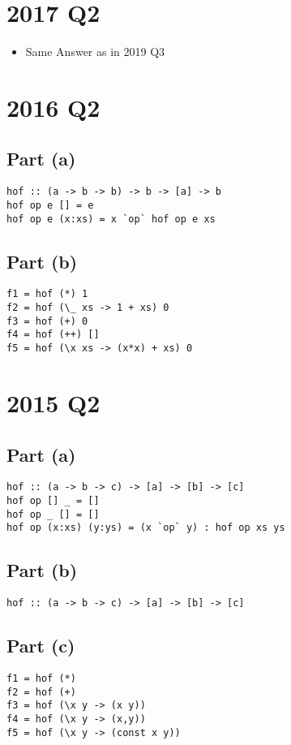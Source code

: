 \documentclass[11pt]{article}
\begin{document}
\section{2017 Q2}
\label{sec:org8e4f95c}
\begin{itemize}
\item Same Answer as in 2019 Q3
\end{itemize}
\section{2016 Q2}
\label{sec:orgf140ca6}
\subsection{Part (a)}
\label{sec:org2d3f31d}
\begin{verbatim}
hof :: (a -> b -> b) -> b -> [a] -> b
hof op e [] = e
hof op e (x:xs) = x `op` hof op e xs
\end{verbatim}
\subsection{Part (b)}
\label{sec:org3aac84a}
\begin{verbatim}
f1 = hof (*) 1
f2 = hof (\_ xs -> 1 + xs) 0
f3 = hof (+) 0
f4 = hof (++) []
f5 = hof (\x xs -> (x*x) + xs) 0
\end{verbatim}
\newpage
\section{2015 Q2}
\label{sec:org20d4326}
\subsection{Part (a)}
\label{sec:orga6fc2ba}
\begin{verbatim}
hof :: (a -> b -> c) -> [a] -> [b] -> [c]
hof op [] _ = []
hof op _ [] = []
hof op (x:xs) (y:ys) = (x `op` y) : hof op xs ys
\end{verbatim}
\subsection{Part (b)}
\label{sec:orgbad515b}
\begin{verbatim}
hof :: (a -> b -> c) -> [a] -> [b] -> [c]
\end{verbatim}
\subsection{Part (c)}
\label{sec:orge31a38c}
\begin{verbatim}
f1 = hof (*)
f2 = hof (+)
f3 = hof (\x y -> (x y))
f4 = hof (\x y -> (x,y))
f5 = hof (\x y -> (const x y))
\end{verbatim}
\end{document}
